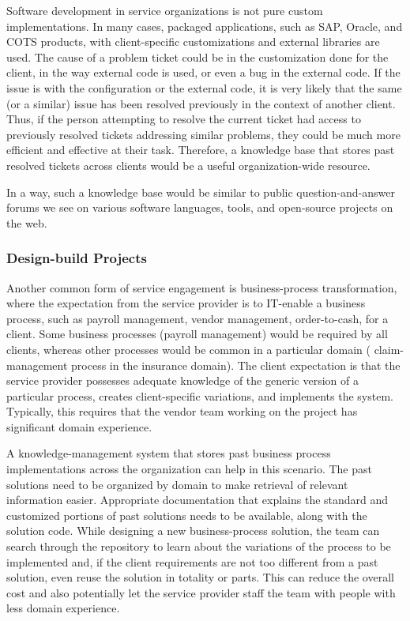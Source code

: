 Software development in service organizations is not pure custom
implementations. In many cases, packaged applications, such as SAP, Oracle, and
COTS products, with client-specific customizations and external libraries are
used. The cause of a problem ticket could be in the customization done for the
client, in the way external code is used, or even a bug in the external code. If
the issue is with the configuration or the external code, it is very likely that
the same (or a similar) issue has been resolved previously in the context of
another client. Thus, if the person attempting to resolve the current ticket had
access to previously resolved tickets addressing similar problems, they could be
much more efficient and effective at their task.  Therefore, a knowledge base
that stores past resolved tickets across clients would be a useful
organization-wide resource. 

In a way, such a knowledge base would be similar to public question-and-answer
forums we see on various software languages, tools, and open-source projects on
the web.

\subsubsection{Design-build Projects}

Another common form of service engagement is business-process transformation,
where the expectation from the service provider is to IT-enable a business
process, such as payroll management, vendor management, order-to-cash, for a
client. Some business processes (\eg payroll management) would be required by
all clients, whereas other processes would be common in a particular domain (\eg
claim-management process in the insurance domain).  The client expectation is
that the service provider possesses adequate knowledge of the generic version of
a particular process, creates client-specific variations, and implements the
system. Typically, this requires that the vendor team working on the project has
significant domain experience.

A knowledge-management system that stores past business process implementations
across the organization can help in this scenario. The past solutions need to be
organized by domain to make retrieval of relevant information
easier. Appropriate documentation that explains the standard and customized
portions of past solutions needs to be available, along with the solution
code. While designing a new business-process solution, the team can search
through the repository to learn about the variations of the process to be
implemented and, if the client requirements are not too different from a past
solution, even reuse the solution in totality or parts. This can reduce the
overall cost and also potentially let the service provider staff the team with
people with less domain experience. 

